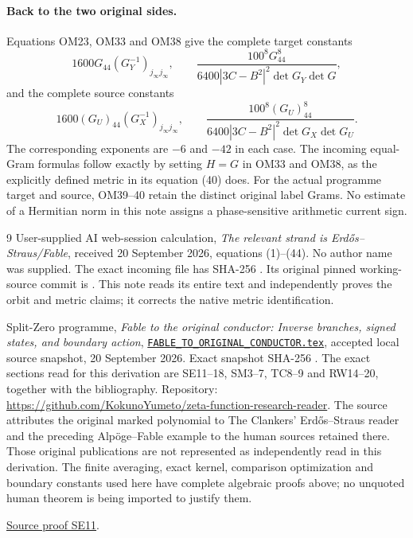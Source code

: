 \documentclass[11pt]{article}
\begin{document}
\paragraph{Back to the two original sides.}
Equations OM23, OM33 and OM38 give the complete target constants
\[
1600G_{44}(G_Y^{-1})_{j_\infty j_\infty},\qquad
\frac{100^8G_{44}^8}
 {6400|3C-B^2|^2\det G_Y\det G},
\tag{OM39}
\]
and the complete source constants
\[
1600(G_U)_{44}(G_X^{-1})_{j_\infty j_\infty},\qquad
\frac{100^8(G_U)_{44}^8}
 {6400|3C-B^2|^2\det G_X\det G_U}.
\tag{OM40}
\]
The corresponding exponents are $-6$ and $-42$ in each case.
The incoming equal-Gram formulas follow exactly by setting
$H=G$ in OM33 and OM38, as the explicitly defined metric in
its equation (40) does.  For the actual programme target and
source, OM39--40 retain the distinct original label Grams.
No estimate of a Hermitian norm in this note assigns a
phase-sensitive arithmetic current sign.

\begin{thebibliography}{9}
User-supplied AI web-session calculation,
\emph{The relevant strand is Erd\H{o}s--Straus/Fable},
received 20 September 2026, equations (1)--(44).
No author name was supplied.
The exact incoming file has SHA-256
.
Its original pinned working-source commit is
.
This note reads its entire text and independently proves the
orbit and metric claims; it corrects the native metric identification.

Split-Zero programme,
\emph{Fable to the original conductor: Inverse branches, signed
states, and boundary action},
\href{https://github.com/KokunoYumeto/zeta-function-research-reader/blob/5992ad50c0f2a06921f1fcaded7b4e38097c0739/workbenches/splitzero-tandem/continuations/20260920-original-kernel-mixed-determinants/providers/FABLE_TO_ORIGINAL_CONDUCTOR.tex\#L1}{\texttt{FABLE\_TO\_ORIGINAL\_CONDUCTOR.tex}},
accepted local source snapshot, 20 September 2026.
Exact snapshot SHA-256
.
The exact sections read for this derivation are SE11--18,
SM3--7, TC8--9 and RW14--20, together with the bibliography.
Repository:
\url{https://github.com/KokunoYumeto/zeta-function-research-reader}.
The source attributes the original marked polynomial to
The Clankers' Erd\H{o}s--Straus reader and the preceding
Alp\"oge--Fable example to the human sources retained there.
Those original publications are not represented as independently
read in this derivation.  The finite averaging, exact kernel,
comparison optimization and boundary constants used here have
complete algebraic proofs above; no unquoted human theorem is
being imported to justify them.

\href{https://github.com/KokunoYumeto/zeta-function-research-reader/blob/5992ad50c0f2a06921f1fcaded7b4e38097c0739/workbenches/splitzero-tandem/continuations/20260920-original-kernel-mixed-determinants/providers/FABLE_TO_ORIGINAL_CONDUCTOR.tex\#L1967}{Source proof SE11}.
\end{thebibliography}
\end{document}

